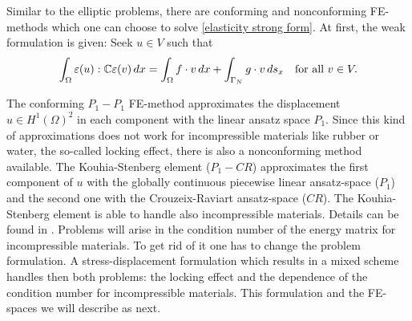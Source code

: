 \bigskip

\noindent Similar to the elliptic problems, there are conforming and nonconforming FE-methods which one can choose to solve \eqref{elasticity strong form}. At first, the weak formulation is given: Seek $u\in V$ such that
\begin{equation}\label{elasticity weak form}
\int_{\Omega} \varepsilon(u):\mathbb{C}\varepsilon(v) \, dx = \int_{\Omega}
f \cdot v \, dx + \int_{\Gamma_N} g\cdot v \, ds_x \quad\text{for
all } v \in V.
\end{equation}

\noindent The conforming $P_1-P_1$ FE-method approximates the displacement $u\in H^1(\Omega)^2$ in each component with the linear ansatz space $P_1$. Since this kind of approximations does not work for incompressible materials like rubber or water, the so-called locking effect, there is also a nonconforming method available. The Kouhia-Stenberg element ($P_1-CR$) approximates the first component of $u$ with the globally continuous piecewise linear ansatz-space ($P_1$) and the second one with the Crouzeix-Raviart ansatz-space ($CR$). The Kouhia-Stenberg element is able to handle also incompressible materials. Details can be found in \cite{Bra,KoSt}. Problems will arise in the condition number of the energy matrix for incompressible materials. To get rid of it one has to change the problem formulation. A stress-displacement formulation which results in a mixed scheme handles then both problems: the locking effect and the dependence of the condition number for incompressible materials. This formulation and the FE-spaces we will describe as next.

\bigskip


